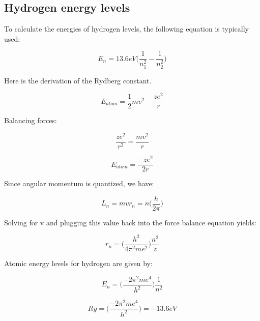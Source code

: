 \subsection{Hydrogen energy levels}

To calculate the energies of hydrogen levels, the following equation is typically used:

\begin{equation}
E_n = 13.6eV\big(\frac{1}{n_1^2} - \frac{1}{n_2^2}\big)
\end{equation}

Here is the derivation of the Rydberg constant.

\begin{equation}
E_{atom} = \frac{1}{2}mv^2 - \frac{ze^2}{r}
\end{equation}

Balancing forces:

\begin{equation}
\frac{ze^2}{r^2} = \frac{mv^2}{r}
\end{equation}

\begin{equation}
E_{atom} = \frac{-ze^2}{2r}
\end{equation}

Since angular momentum is quantized, we have:

\begin{equation}
L_n = mvr_n = n\big(\frac{h}{2\pi}\big)
\end{equation}

Solving for v and plugging this value back into the force balance equation yields:

\begin{equation}
r_n = \big(\frac{h^2}{4\pi^2me^2}\big)\frac{n^2}{z}
\end{equation}

Atomic energy levels for hydrogen are given by:

\begin{equation}
E_n = \big(\frac{-2\pi^2me^4}{h^2}\big)\frac{1}{n^2}
\end{equation}

\begin{equation}
Ry = \big(\frac{-2\pi^2me^4}{h^2}\big) = -13.6eV
\end{equation}



